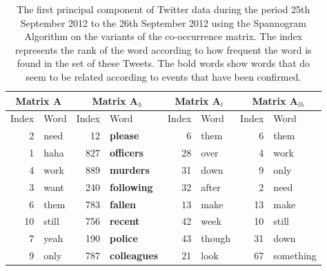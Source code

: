 \documentclass[11pt,a4paper]{article}
\newcommand{\covmat}{\mathbf{A}}
\begin{document}
\begin{table}[H]
\center
\begin{tabular}{| r | l | r | l| r | l | r | l|}
\hline
\multicolumn{2}{|c|}{Matrix $\covmat$ }& \multicolumn{2}{|c|}{Matrix $\covmat_h$}& \multicolumn{2}{|c|}{Matrix $\covmat_l$} & \multicolumn{2}{|c|}{Matrix $\covmat_{lh}$} \\

\hline
Index & Word &Index & Word & Index & Word & Index & Word\\
\hline
2 & need & 12 & \textbf{please}  & 6 & them & 6 & them\\
1 & haha & 827 & \textbf{officers}  &28 & over &  4 & work\\
4 & work &889 & \textbf{murders} & 31 & down& 9 & only \\

3 & want & 240 & \textbf{following} &32 & after & 2 & need \\

6 & them & 783 & \textbf{fallen}&13 & make  & 13 & make\\

10 & still & 756 & \textbf{recent} &42 & week & 10 & still  \\ 

7 & yeah&190 & \textbf{police}  & 43 & though & 31 & down\\
 
9 & only & 787 & \textbf{colleagues} & 21 & look & 67 & something \\


\hline
\end{tabular}
\label{pcs_police}
\caption{The first principal component of Twitter data during the period 25th September 2012 to the 26th September 2012 using the Spannogram Algorithm on the variants of the co-occurrence matrix. The index represents the rank of the word according to how frequent the word is found in the set of these Tweets. The bold words show words that do seem to be related according to events that have been confirmed.}
\end{table}
\end{document}
